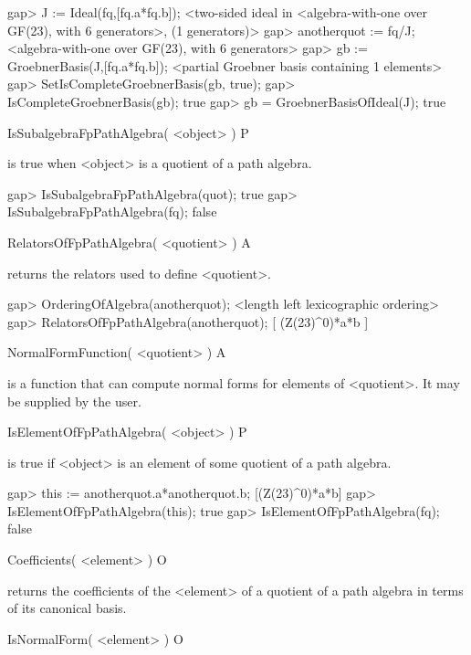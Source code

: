 \beginexample
gap> J := Ideal(fq,[fq.a*fq.b]);
<two-sided ideal in <algebra-with-one over GF(23), with 6 generators>,
  (1 generators)>
gap> anotherquot := fq/J;
<algebra-with-one over GF(23), with 6 generators>
gap> gb := GroebnerBasis(J,[fq.a*fq.b]);
<partial Groebner basis containing 1 elements>
gap> SetIsCompleteGroebnerBasis(gb, true);
gap> IsCompleteGroebnerBasis(gb);
true
gap> gb = GroebnerBasisOfIdeal(J);
true
\endexample


\>IsSubalgebraFpPathAlgebra( <object> ) P

is true when <object> is a quotient of a path algebra.

\beginexample
gap> IsSubalgebraFpPathAlgebra(quot);
true
gap> IsSubalgebraFpPathAlgebra(fq);
false
\endexample


\>RelatorsOfFpPathAlgebra( <quotient> ) A

returns the relators used to define <quotient>.

\beginexample
gap> OrderingOfAlgebra(anotherquot);
<length left lexicographic ordering>
gap> RelatorsOfFpPathAlgebra(anotherquot);
[ (Z(23)^0)*a*b ]
\endexample

\>NormalFormFunction( <quotient> ) A

is a function that can compute normal forms for elements
of <quotient>.
It may be supplied by the user.

\>IsElementOfFpPathAlgebra( <object> ) P

is true if <object> is an element of some quotient of a path algebra.

\beginexample
gap> this := anotherquot.a*anotherquot.b;
[(Z(23)^0)*a*b]
gap> IsElementOfFpPathAlgebra(this);
true
gap> IsElementOfFpPathAlgebra(fq);
false
\endexample

\>Coefficients( <element> ) O

returns the coefficients of the <element> of a quotient
of a path algebra
in terms of its canonical basis.


\>IsNormalForm( <element> ) O

